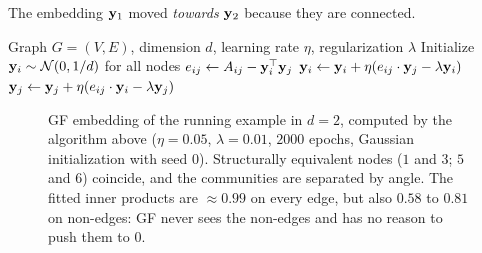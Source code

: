 \begin{notechapter}
\begin{example}
The embedding $\mathbf{y}_1$ moved \emph{towards} $\mathbf{y}_2$ because they are connected.
\end{example}

\begin{algorithm}
\caption{Graph factorization (stochastic gradient descent)}
\begin{algorithmic}[1]
\Require Graph $G = (V, E)$, dimension $d$, learning rate $\eta$, regularization $\lambda$
\State Initialize $\mathbf{y}_i \sim \mathcal{N}(0, 1/d)$ for all nodes
        \State $e_{ij} \gets A_{ij} - \mathbf{y}_i^\top \mathbf{y}_j$ 
        \State $\mathbf{y}_i \gets \mathbf{y}_i + \eta(e_{ij} \cdot \mathbf{y}_j - \lambda \mathbf{y}_i)$
        \State $\mathbf{y}_j \gets \mathbf{y}_j + \eta(e_{ij} \cdot \mathbf{y}_i - \lambda \mathbf{y}_j)$
    \EndFor
\EndFor
\end{algorithmic}
\end{algorithm}

\begin{figure}[htbp]
\centering
{}
\caption{GF embedding of the running example in $d = 2$, computed by the algorithm above ($\eta = 0.05$, $\lambda = 0.01$, $2000$ epochs, Gaussian initialization with seed $0$). Structurally equivalent nodes ($1$ and $3$; $5$ and $6$) coincide, and the communities are separated by angle. The fitted inner products are $\approx 0.99$ on every edge, but also $0.58$ to $0.81$ on non-edges: GF never sees the non-edges and has no reason to push them to $0$.}
\label{shallow-embeddings:fig:gf_embedding}
\end{figure}


\end{notechapter}
